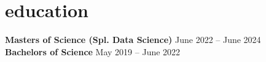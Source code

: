 \section{education}\label{sec:education}%
\begin{raggedright}
    \textbf{Masters of Science (Spl. Data Science)} \hfill {June 2022 -- June 2024} \\ 
    \textbf{Bachelors of Science} \hfill {May 2019 -- June 2022} \\
\end{raggedright}